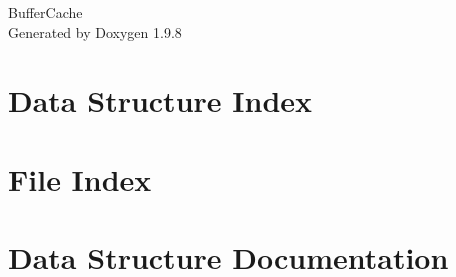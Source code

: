 \documentclass[twoside]{book}
\newcommand{\+}{\discretionary{\mbox{\scriptsize$\hookleftarrow$}}{}{}}
\newcommand{\clearemptydoublepage}{%
    \newpage{\pagestyle{empty}\cleardoublepage}%
  }
\begin{document}
  \raggedbottom
    \hypersetup{pageanchor=false,
                bookmarksnumbered=true,
                pdfencoding=unicode
               }
  \begin{titlepage}
  \vspace*{7cm}
  \begin{center}%
  {\Large Buffer\+Cache}\\
  \vspace*{1cm}
  {\large Generated by Doxygen 1.9.8}\\
  \end{center}
  \end{titlepage}
  \clearemptydoublepage
  \tableofcontents
  \clearemptydoublepage
  \hypersetup{pageanchor=true}

\chapter{Data Structure Index}

\chapter{File Index}

\chapter{Data Structure Documentation}









































\end{document}
